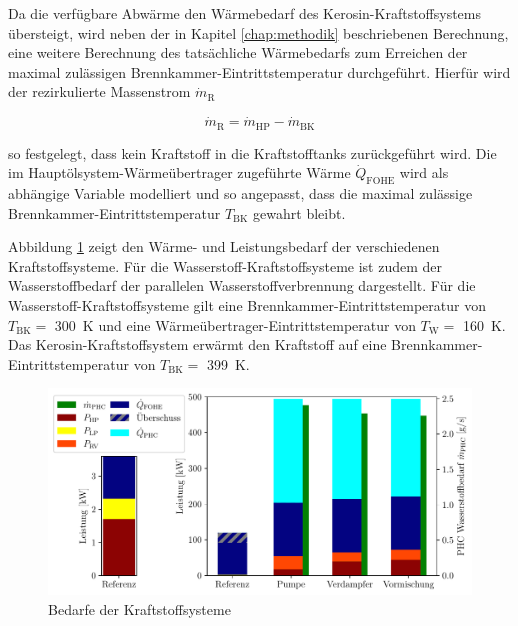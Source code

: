 Da die verfügbare Abwärme den Wärmebedarf des Kerosin-Kraftstoffsystems übersteigt, wird neben der in Kapitel \ref{chap:methodik} beschriebenen Berechnung, eine weitere Berechnung des tatsächliche Wärmebedarfs zum Erreichen der maximal zulässigen Brennkammer-Eintrittstemperatur durchgeführt. Hierfür wird der rezirkulierte Massenstrom $\dot{m}_\mathrm{R}$

\begin{equation}
	 \dot{m}_\mathrm{R}=\dot{m}_\mathrm{HP}-\dot{m}_\mathrm{BK} 
\end{equation}
 
so festgelegt, dass kein Kraftstoff in die Kraftstofftanks zurückgeführt wird. Die im Hauptölsystem-Wärmeübertrager zugeführte Wärme $\dot{Q}_\mathrm{FOHE}$ wird als abhängige Variable modelliert und so angepasst, dass die maximal zulässige Brennkammer-Eintrittstemperatur $T_\mathrm{BK}$ gewahrt bleibt.

Abbildung \ref{fig:refcomp} zeigt den Wärme- und Leistungsbedarf der verschiedenen Kraftstoffsysteme. Für die Wasserstoff-Kraftstoffsysteme ist zudem der Wasserstoffbedarf der parallelen Wasserstoffverbrennung dargestellt. Für die Wasserstoff-Kraftstoffsysteme gilt eine Brennkammer-Eintrittstemperatur von $T_\mathrm{BK}=$ \SI{300}{\K} und eine Wärmeübertrager-Eintrittstemperatur von $T_\mathrm{W}=$ \SI{160}{\K}. Das Kerosin-Kraftstoffsystem erwärmt den Kraftstoff auf eine Brennkammer-Eintrittstemperatur von $T_\mathrm{BK}=$ \SI{399}{\K}.

\begin{figure}[ht]
\centering
\includegraphics[width=1\linewidth]{4_Abbildungen/2_Hauptteil/Ergebnisse/refcomp.pdf}
  \caption{Bedarfe der Kraftstoffsysteme}
  \label{fig:refcomp}
\end{figure}
\FloatBarrier

